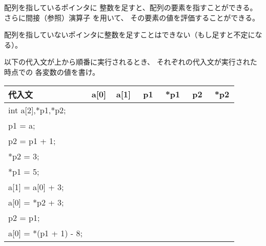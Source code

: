 \documentclass[12pt,a4j]{jarticle}
\begin{document}

配列を指しているポインタに
整数を足すと、配列の要素を指すことができる。
さらに間接（参照）演算子 {\ttfamily *} を用いて、
その要素の値を評価することができる。

配列を指していないポインタに整数を足すことはできない（もし足すと不定になる）。


以下の代入文が上から順番に実行されるとき、
それぞれの代入文が実行された時点での
各変数の値を書け。


\begin{center}\ttfamily
 \begin{tabular}{|l|c|c|c|c|c|c|}\hline
  代入文 & a[0] & a[1] & p1 & *p1 & p2 & *p2\\ \hline\hline
  int a[2],*p1,*p2; & 　　& 　　& 　　& 　　& 　　& 　　\\  \cline{2-7}   
  p1 = a;           & 　　& 　　& 　　& 　　& 　　& 　　\\  \cline{2-7}   
  p2 = p1 + 1;      & 　　& 　　& 　　& 　　& 　　& 　　\\  \cline{2-7}   
  *p2 = 3;          & 　　& 　　& 　　& 　　& 　　& 　　\\  \cline{2-7}   
  *p1 = 5;          & 　　& 　　& 　　& 　　& 　　& 　　\\  \cline{2-7}   
  a[1] = a[0] + 3;  & 　　& 　　& 　　& 　　& 　　& 　　\\  \cline{2-7}   
  a[0] = *p2 + 3;   & 　　& 　　& 　　& 　　& 　　& 　　\\  \cline{2-7}   
  p2 = p1;          & 　　& 　　& 　　& 　　& 　　& 　　\\  \cline{2-7}   
  a[0] = *(p1 + 1) - 8;  & 　　& 　　& 　　& 　　& 　　& 　　\\  \hline
 \end{tabular}
\end{center}
\end{document}
